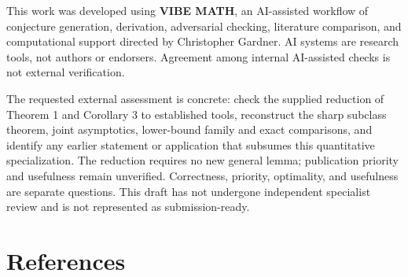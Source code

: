 \documentclass[
  11pt,
  a4paper,
]{article}
\begin{document}
This work was developed using \textbf{VIBE MATH}, an AI-assisted
workflow of conjecture generation, derivation, adversarial checking,
literature comparison, and computational support directed by Christopher
Gardner. AI systems are research tools, not authors or endorsers.
Agreement among internal AI-assisted checks is not external
verification.

The requested external assessment is concrete: check the supplied
reduction of Theorem 1 and Corollary 3 to established tools, reconstruct
the sharp subclass theorem, joint asymptotics, lower-bound family and
exact comparisons, and identify any earlier statement or application
that subsumes this quantitative specialization. The reduction requires
no new general lemma; publication priority and usefulness remain
unverified. Correctness, priority, optimality, and usefulness are
separate questions. This draft has not undergone independent specialist
review and is not represented as submission-ready.

\section*{References}\label{references}
\end{document}
